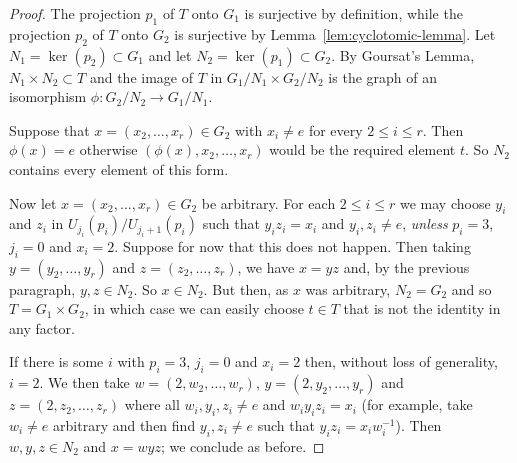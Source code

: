 \documentclass{amsart}
\theoremstyle{plain}
\theoremstyle{remark}
\begin{document}
\begin{proof}
    The projection $p_1$ of $T$ onto $G_1$ is surjective by definition, while the projection $p_2$ of $T$ onto $G_2$ is
    surjective by Lemma~\ref{lem:cyclotomic-lemma}. Let $N_1 = \ker(p_2) \subset G_1$ and let
    $N_2 = \ker(p_1) \subset G_2$. By Goursat's Lemma, $N_1 \times N_2 \subset T$ and the image of $T$ in
    $G_1/N_1 \times G_2 / N_2$ is the graph of an isomorphism $\phi : G_2/N_2 \to G_1/N_1$.

    Suppose that $x = (x_2, \ldots, x_r) \in G_2$ with $x_i \ne e$ for every $2 \le i \le r$. Then $\phi(x) = e$
    otherwise $(\phi(x), x_2, \ldots, x_r)$ would be the required element $t$. So $N_2$ contains every element of this
    form.

    Now let $x = (x_2, \ldots, x_r) \in G_2$ be arbitrary. For each $2 \le i \le r$ we may choose $y_i$ and $z_i$ in
    $U_{j_i}(p_i)/U_{j_i+1}(p_i)$ such that $y_i z_i = x_i$ and $y_i, z_i \ne e$, \emph{unless} $p_i = 3$, $j_i = 0$ and
    $x_i = 2$. Suppose for now that this does not happen. Then taking $y = (y_2, \ldots, y_r)$ and
    $z = (z_2, \ldots, z_r)$, we have $x = yz$ and, by the previous paragraph, $y, z \in N_2$. So $x \in N_2$. But then,
    as $x$ was arbitrary, $N_2 = G_2$ and so $T = G_1 \times G_2$, in which case we can easily choose $t \in T$ that is
    not the identity in any factor.

    If there is some $i$ with $p_i = 3$, $j_i = 0$ and $x_i = 2$ then, without loss of generality, $i = 2$. We then take
    $w = (2,w_2, \ldots, w_r)$, $y = (2, y_2, \ldots, y_r)$ and $z = (2, z_2, \ldots, z_r)$ where all
    $w_i, y_i, z_i \ne e$ and $w_iy_iz_i = x_i$ (for example, take $w_i \ne e$ arbitrary and then find $y_i, z_i \ne e$
    such that $y_i z_i = x_i w_i^{-1}$). Then $w, y, z \in N_2$ and $x = wyz$; we conclude as before.
\end{proof}
\end{document}
